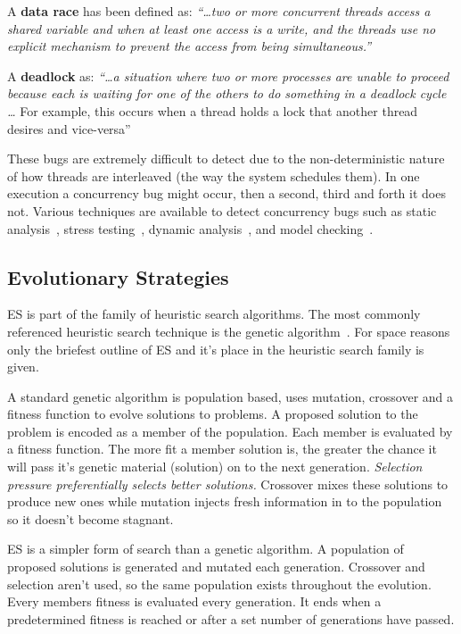 \documentclass{llncs}
\begin{document}
A \textbf{data race} has been defined as: \textit{``\ldots two or more
concurrent threads access a shared variable and when at least one access is a
write, and the threads use no explicit mechanism to prevent the access from
being simultaneous.''}~\cite{LSW07}

A \textbf{deadlock} as: \textit{``\ldots a situation where two or more
processes are unable to proceed because each is waiting for one of the others
to do something in a deadlock cycle \ldots} For example, this occurs when a
thread holds a lock that another thread desires and vice-versa''~\cite{LSW07}

These bugs are extremely difficult to detect due to the non-deterministic
nature of how threads are interleaved (the way the system schedules them). In
one execution a concurrency bug might occur, then a second, third and forth it
does not. Various techniques are available to detect concurrency bugs such as
static analysis~\cite{NA07,NPSG09,HP04}, stress testing~\cite{HSU03}, dynamic
analysis~\cite{JNPS09,EFN+02}, and model
checking~\cite{BHPV00,RDH03,OM03,MQB07,Holz97,JM04,HP00}.

\subsection{Evolutionary Strategies}
\label{sec:evolutionary_strategies}

ES is part of the family of heuristic search algorithms. The most commonly
referenced heuristic search technique is the genetic algorithm~\cite{GA92}. For
space reasons only the briefest outline of ES and it's place in the heuristic
search family is given.

A standard genetic algorithm is population based, uses mutation, crossover and
a fitness function to evolve solutions to problems. A proposed solution to the
problem is encoded as a member of the population. Each member is evaluated by a
fitness function. The more fit a member solution is, the greater the chance it
will pass it's genetic material (solution) on to the next generation.
\textit{Selection pressure preferentially selects better solutions.} Crossover
mixes these solutions to produce new ones while mutation injects fresh
information in to the population so it doesn't become stagnant.

ES is a simpler form of search than a genetic algorithm. A population of
proposed solutions is generated and mutated each generation. Crossover and
selection aren't used, so the same population exists throughout the evolution.
Every members fitness is evaluated every generation. It ends when a
predetermined fitness is reached or after a set number of generations have
passed.
\end{document}
